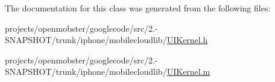 \-The documentation for this class was generated from the following files\-:\begin{DoxyCompactItemize}
\item 
projects/openmobster/googlecode/src/2.-\/\-S\-N\-A\-P\-S\-H\-O\-T/trunk/iphone/mobilecloudlib/\hyperlink{_u_i_kernel_8h}{\-U\-I\-Kernel.\-h}\item 
projects/openmobster/googlecode/src/2.-\/\-S\-N\-A\-P\-S\-H\-O\-T/trunk/iphone/mobilecloudlib/\hyperlink{_u_i_kernel_8m}{\-U\-I\-Kernel.\-m}\end{DoxyCompactItemize}
